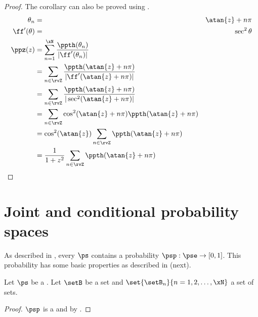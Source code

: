 \begin{proof}
The corollary can also be proved using .
\begin{align*}
  \theta_n &=& \atan{z}+n\pi \\
  \ff'(\theta) &=& \sec^2 \theta    \\
  \ppz(z)
    &= \sum_{n=1}^{\xN} \frac{\ppth(\theta_n)}{|\ff'(\theta_n)|}
  \\&= \sum_{n\in\rvZ}\frac{\ppth(\atan{z}+n\pi)}{|\ff'(\atan{z}+n\pi)|}
  \\&= \sum_{n\in\rvZ}\frac{\ppth(\atan{z}+n\pi)}{|\sec^2(\atan{z}+n\pi)|}
  \\&= \sum_{n\in\rvZ}\cos^2(\atan{z}+n\pi)  \ppth(\atan{z}+n\pi)
  \\&= \cos^2(\atan{z}) \sum_{n\in\rvZ} \ppth(\atan{z}+n\pi)
  \\&= \frac{1}{1+z^2}  \sum_{n\in\rvZ}\ppth(\atan{z}+n\pi)
\end{align*}
\end{proof}

\section{Joint and conditional probability spaces}
As described in ,
every  $\ps$ contains a probability  $\psp:\pse\to[0,1]$.
This probability  has some basic properties as described in
 (next).
\begin{theorem}
\label{thm:P}
Let $\ps$ be a .
Let $\setB$ be a set and $\set{\setB_n}{n=1,2,\ldots,\xN}$ a set of sets.
\end{theorem}
\begin{proof}
$\psp$ is a  and by .
\end{proof}

